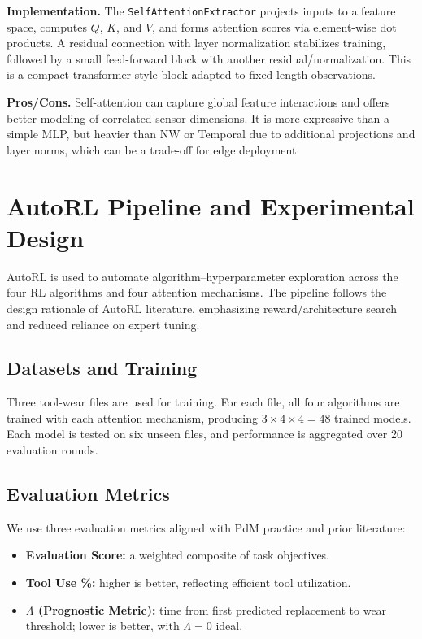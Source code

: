 \documentclass[11pt]{article}
\begin{document}
\textbf{Implementation.} The \texttt{SelfAttentionExtractor} projects inputs to a feature space, computes $Q$, $K$, and $V$, and forms attention scores via element-wise dot products. A residual connection with layer normalization stabilizes training, followed by a small feed-forward block with another residual/normalization. This is a compact transformer-style block adapted to fixed-length observations.

\textbf{Pros/Cons.} Self-attention can capture global feature interactions and offers better modeling of correlated sensor dimensions. It is more expressive than a simple MLP, but heavier than NW or Temporal due to additional projections and layer norms, which can be a trade-off for edge deployment.

\section{AutoRL Pipeline and Experimental Design}
AutoRL is used to automate algorithm--hyperparameter exploration across the four RL algorithms and four attention mechanisms. The pipeline follows the design rationale of AutoRL literature, emphasizing reward/architecture search and reduced reliance on expert tuning. \cite{Faust2019EvolvingRewards,ARLO2023}

\subsection{Datasets and Training}
Three tool-wear files are used for training. For each file, all four algorithms are trained with each attention mechanism, producing $3 \times 4 \times 4 = 48$ trained models. Each model is tested on six unseen files, and performance is aggregated over 20 evaluation rounds.

\subsection{Evaluation Metrics}
We use three evaluation metrics aligned with PdM practice and prior literature: \cite{Siraskar2023RLReview}
\begin{itemize}
  \item \textbf{Evaluation Score:} a weighted composite of task objectives.
  \item \textbf{Tool Use \%:} higher is better, reflecting efficient tool utilization.
  \item \textbf{$\Lambda$ (Prognostic Metric):} time from first predicted replacement to wear threshold; lower is better, with $\Lambda=0$ ideal.
\end{itemize}
\end{document}
